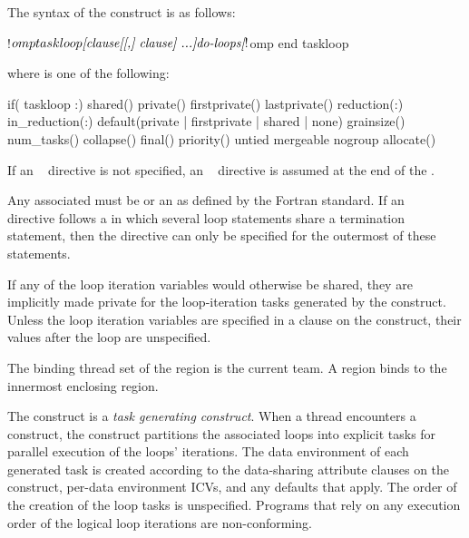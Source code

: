 \begin{fortranspecific}
The syntax of the  construct is as follows:
\begin{ompfPragma}
!$omp taskloop \plc{[clause[[,] clause] ...]}
    \plc{do-loops}
\plc{[}!$omp end taskloop\plc{]}
\end{ompfPragma}
where  is one of the following:
\begin{indentedcodelist}
if(\plc{[} taskloop :\plc{] scalar-logical-expr})
shared()
private()
firstprivate()
lastprivate()
reduction(:)
in_reduction(:)
default(private \textnormal{|} firstprivate \textnormal{|} shared \textnormal{|} none)
grainsize()
num_tasks()
collapse()
final()
priority()
untied
mergeable
nogroup
allocate(\plc{[allocator: ]})
\end{indentedcodelist}

If an ~ directive is not specified, an
~ directive is assumed at the end of the
.

Any associated  must be  or an
 as defined by the Fortran standard.
If an ~ directive follows a 
in which several loop statements share a 
termination statement, then the directive can only be specified for the
outermost of these  statements.

If any of the loop iteration variables would otherwise be shared, they are implicitly made private for the loop-iteration tasks generated by the  construct. Unless the loop iteration variables are specified in a  clause on the  construct, their values after the loop are unspecified.
\end{fortranspecific}

\binding
The binding thread set of the  region is the current team. A  region binds to the innermost enclosing  region.

\descr
The  construct is a \emph{task generating construct}. When a thread encounters a  construct, the construct partitions the associated loops into explicit tasks for parallel execution of the loops' iterations. The data environment of each generated task is created according to the data-sharing attribute clauses on the  construct, per-data environment ICVs, and any defaults that apply. The order of the creation of the loop tasks is unspecified.
Programs that rely on any execution order of the logical loop iterations are non-conforming.

